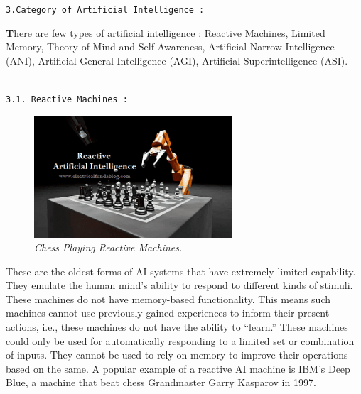 \documentclass{article}
\begin{document}
\begin{large}
\texttt{3.Category of Artificial Intelligence :}\\ 
\end{large}

\textbf{\Huge T}here are few types of artificial intelligence : Reactive Machines, Limited Memory, Theory of Mind and Self-Awareness, Artificial Narrow Intelligence (ANI), Artificial General Intelligence (AGI), Artificial Superintelligence (ASI).\\\\



\begin{large}
\texttt{3.1. Reactive Machines :}
\end{large}

\begin{figure}
\centering
\includegraphics[width=2.9in]{Chess Play}
\caption{\textit{Chess Playing Reactive Machines.}}
\end{figure}

These are the oldest forms of AI systems that have extremely limited capability. They emulate the human mind’s ability to respond to different kinds of stimuli. These machines do not have memory-based functionality. This means such machines cannot use previously gained experiences to inform their present actions, i.e., these machines do not have the ability to “learn.” These machines could only be used for automatically responding to a limited set or combination of inputs. They cannot be used to rely on memory to improve their operations based on the same. A popular example of a reactive AI machine is IBM’s Deep Blue, a machine that beat chess Grandmaster Garry Kasparov in 1997.\\\\\\\\\\\\\\\\\\
\end{document}

